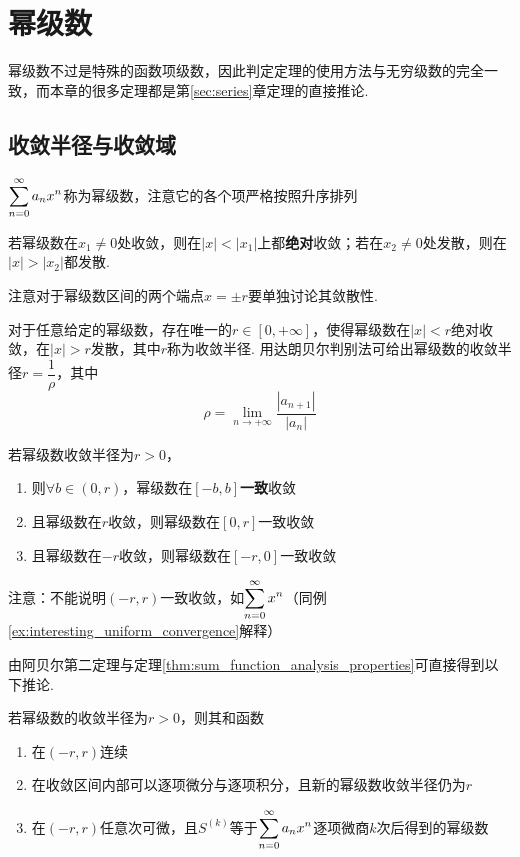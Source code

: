 
\section{幂级数}
幂级数不过是特殊的函数项级数，因此判定定理的使用方法与无穷级数的完全一致，而本章的很多定理都是第\ref{sec:series}章定理的直接推论.
\subsection{收敛半径与收敛域}
\begin{definition}[幂级数]
$\displaystyle\sum_{n=0}^{\infty}a_nx^n$称为幂级数，注意它的各个项严格按照升序排列
\end{definition}
\begin{theorem}
若幂级数在$x_1\neq 0$处收敛，则在$|x|<|x_1|$上都\textbf{绝对}收敛；若在$x_2\neq 0$处发散，则在$|x|>|x_2|$都发散.
\end{theorem}
\par 注意对于幂级数区间的两个端点$x=\pm r$要单独讨论其敛散性.
\begin{definition}
对于任意给定的幂级数，存在唯一的$r\in[0,+\infty]$，使得幂级数在$|x|<r$绝对收敛，在$|x|>r$发散，其中$r$称为收敛半径. 用达朗贝尔判别法可给出幂级数的收敛半径$r=\dfrac{1}{\rho}$，其中
\[\rho=\lim_{n\to+\infty}\dfrac{|a_{n+1}|}{|a_n|}\]
\end{definition}
\begin{theorem}[阿贝尔第二定理]
若幂级数收敛半径为$r>0$，
\begin{enumerate}
	\itemsep -3pt
	\item 则$\forall b\in(0,r)$，幂级数在$[-b,b]$\textbf{一致}收敛
	\item 且幂级数在$r$收敛，则幂级数在$[0,r]$一致收敛
	\item 且幂级数在$-r$收敛，则幂级数在$[-r,0]$一致收敛
\end{enumerate}
注意：不能说明$(-r,r)$一致收敛，如$\displaystyle\sum_{n=0}^{\infty}x^n$（同例\ref{ex:interesting_uniform_convergence}解释）
\end{theorem}
\par 由阿贝尔第二定理与定理\ref{thm:sum_function_analysis_properties}可直接得到以下推论.
\begin{corollary2}[幂级数和函数的分析性质]
若幂级数的收敛半径为$r>0$，则其和函数
\begin{enumerate}
	\itemsep -3pt
	\item 在$(-r,r)$连续
	\item 在收敛区间内部可以逐项微分与逐项积分，且新的幂级数收敛半径仍为$r$
	\item 在$(-r,r)$任意次可微，且$S^{(k)}$等于$\displaystyle\sum_{n=0}^{\infty}a_nx^n$逐项微商$k$次后得到的幂级数
\end{enumerate}
\end{corollary2}
